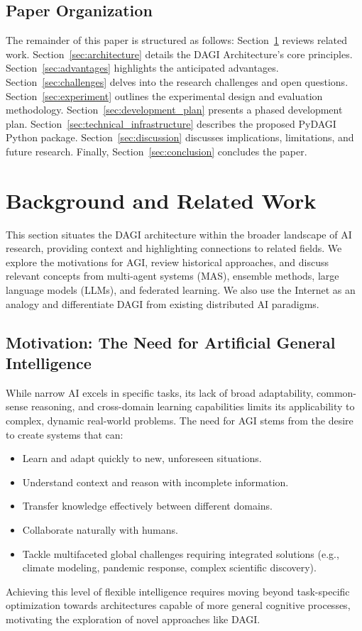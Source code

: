 \documentclass[12pt]{amsart}
\begin{document}
\subsection{Paper Organization}
The remainder of this paper is structured as follows: Section~\ref{sec:background} reviews related work. Section~\ref{sec:architecture} details the DAGI Architecture's core principles. Section~\ref{sec:advantages} highlights the anticipated advantages. Section~\ref{sec:challenges} delves into the research challenges and open questions. Section~\ref{sec:experiment} outlines the experimental design and evaluation methodology. Section~\ref{sec:development_plan} presents a phased development plan. Section~\ref{sec:technical_infrastructure} describes the proposed PyDAGI Python package. Section~\ref{sec:discussion} discusses implications, limitations, and future research. Finally, Section~\ref{sec:conclusion} concludes the paper.

\section{Background and Related Work}
\label{sec:background}
This section situates the DAGI architecture within the broader landscape of AI research, providing context and highlighting connections to related fields. We explore the motivations for AGI, review historical approaches, and discuss relevant concepts from multi-agent systems (MAS), ensemble methods, large language models (LLMs), and federated learning. We also use the Internet as an analogy and differentiate DAGI from existing distributed AI paradigms.

\subsection{Motivation: The Need for Artificial General Intelligence}
While narrow AI excels in specific tasks, its lack of broad adaptability, common-sense reasoning, and cross-domain learning capabilities limits its applicability to complex, dynamic real-world problems. The need for AGI stems from the desire to create systems that can:
\begin{itemize}[leftmargin=*]
    \item Learn and adapt quickly to new, unforeseen situations.
    \item Understand context and reason with incomplete information.
    \item Transfer knowledge effectively between different domains.
    \item Collaborate naturally with humans.
    \item Tackle multifaceted global challenges requiring integrated solutions (e.g., climate modeling, pandemic response, complex scientific discovery).
\end{itemize}
Achieving this level of flexible intelligence requires moving beyond task-specific optimization towards architectures capable of more general cognitive processes, motivating the exploration of novel approaches like DAGI.
\end{document}

